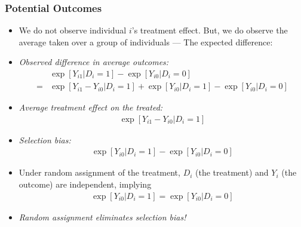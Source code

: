 \begin{frame}
\frametitle{Potential Outcomes}
\begin{itemize}
\item We do not observe individual $i$'s treatment effect. But, we do observe the average taken over a group of individuals --- The expected difference:
\item \emph{Observed difference in average outcomes:}
\begin{align*}
& \exp[Y_{i1} | D_i = 1] - \exp[Y_{i0} | D_i = 0] \\ 
= & \exp[Y_{i1} - Y_{i0} | D_i = 1] 
  + \exp[Y_{i0}|D_i = 1] - \exp[Y_{i0} | D_i = 0]
\end{align*}
\item \emph{Average treatment effect on the treated:}
\begin{align*}
\exp[Y_{i1} - Y_{i0} | D_i = 1]
\end{align*}
\item \emph{Selection bias:}
\begin{align*}
\exp[Y_{i0}|D_i = 1] - \exp[Y_{i0} | D_i = 0]
\end{align*}
\item Under random assignment of the treatment, $D_i$ (the treatment) and $Y_{i}$ (the outcome) are independent, implying
\begin{align*}
\exp[Y_{i0}|D_i = 1] = \exp[Y_{i0} | D_i = 0]
\end{align*}
\item \emph{Random assignment eliminates selection bias!}
\end{itemize}
\end{frame}


